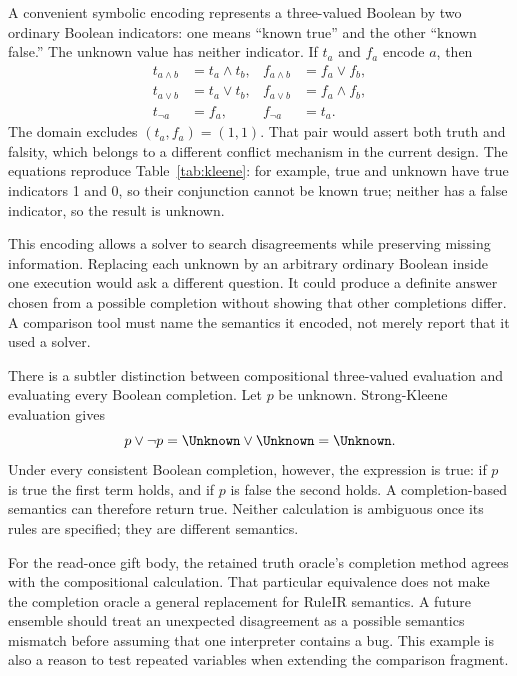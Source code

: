 
A convenient symbolic encoding represents a three-valued Boolean by two ordinary
Boolean indicators: one means ``known true'' and the other ``known false.'' The
unknown value has neither indicator. If $t_a$ and $f_a$ encode $a$, then
\begin{align}
 t_{a\land b}&=t_a\land t_b,& f_{a\land b}&=f_a\lor f_b,\label{eq:kleene-and}\\
 t_{a\lor b}&=t_a\lor t_b,& f_{a\lor b}&=f_a\land f_b,\label{eq:kleene-or}\\
 t_{\neg a}&=f_a,& f_{\neg a}&=t_a.\label{eq:kleene-not}
\end{align}
The domain excludes $(t_a,f_a)=(1,1)$. That pair would assert both truth and
falsity, which belongs to a different conflict mechanism in the current design.
The equations reproduce Table~\ref{tab:kleene}: for example, true and unknown
have true indicators 1 and 0, so their conjunction cannot be known true; neither
has a false indicator, so the result is unknown.

This encoding allows a solver to search disagreements while preserving missing
information. Replacing each unknown by an arbitrary ordinary Boolean inside
one execution would ask a different question. It could produce a definite answer
chosen from a possible completion without showing that other completions differ.
A comparison tool must name the semantics it encoded, not merely report that it
used a solver.

There is a subtler distinction between compositional three-valued evaluation
and evaluating every Boolean completion. Let $p$ be unknown. Strong-Kleene
evaluation gives
\begin{equation}
 p\lor\neg p=\Unknown\lor\Unknown=\Unknown.
 \label{eq:unknown-tautology}
\end{equation}
Under every consistent Boolean completion, however, the expression is true:
if $p$ is true the first term holds, and if $p$ is false the second holds. A
completion-based semantics can therefore return true. Neither calculation is
ambiguous once its rules are specified; they are different semantics.

For the read-once gift body, the retained truth oracle's completion method agrees
with the compositional calculation. That particular equivalence does not make
the completion oracle a general replacement for RuleIR semantics. A future
ensemble should treat an unexpected disagreement as a possible semantics
mismatch before assuming that one interpreter contains a bug. This example is
also a reason to test repeated variables when extending the comparison fragment.

